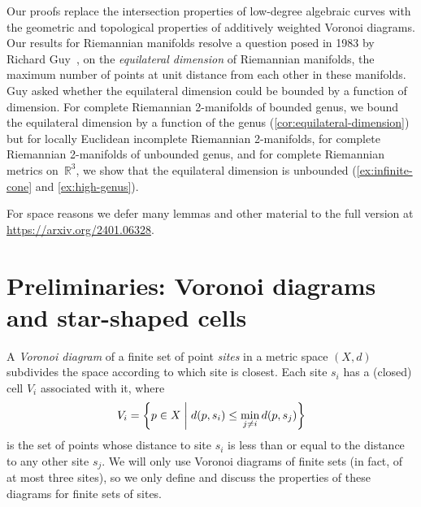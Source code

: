 \documentclass[11pt]{article}
\theoremstyle{definition}
\begin{document}
Our proofs replace the intersection properties of low-degree algebraic curves with the geometric and topological properties of additively weighted Voronoi diagrams. Our results for Riemannian manifolds resolve a question posed in 1983 by Richard Guy~\cite{Guy-AMM-83}, on the \emph{equilateral dimension} of Riemannian manifolds, the maximum number of points at unit distance from each other in these manifolds. Guy asked whether the equilateral dimension could be bounded by a function of dimension. For complete Riemannian 2-manifolds of bounded genus, we bound  the equilateral dimension by a function of the genus (\cref{cor:equilateral-dimension}) but for locally Euclidean incomplete Riemannian 2-manifolds,  for complete Riemannian 2-manifolds of unbounded genus, and for complete Riemannian metrics on~$\mathbb{R}^3$, we show that the equilateral dimension is unbounded (\cref{ex:infinite-cone} and \cref{ex:high-genus}).

\iffull
\else
For space reasons we defer many lemmas and other material to the full version at \url{https://arxiv.org/2401.06328}.
\fi

\section{Preliminaries: Voronoi diagrams and star-shaped cells}

A \emph{Voronoi diagram} of a finite set of point \emph{sites} in a metric space $(X,d)$ subdivides the space according to which site is closest. Each site $s_i$ has a (closed) cell $V_i$ associated with it, where
\[
V_i=\left\{ p\in X \biggm\vert d(p,s_i)\le \min_{j\ne i} d(p,s_j)\right\}
\]
is the set of points whose distance to site $s_i$ is less than or equal to the distance to any other site $s_j$. We will only use Voronoi diagrams of finite sets (in fact, of at most three sites), so we only define and discuss the properties of these diagrams for finite sets of sites.
\end{document}
